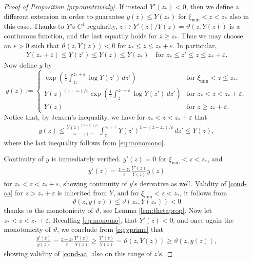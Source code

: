 \documentclass[reqno]{amsart}
\newcommand{\eps}{{\varepsilon}}
\begin{document}
\begin{proof}[Proof of Proposition \ref{prp:nontrivialy}]
    If instead $Y'(z_*)<0$, then we define a different extension in order to guarantee $y(z)\le Y(z_*)$ for $\xi_\text{min}<z<z_*$ also in this case. Thanks to $Y$'s $C^1$-regularity, $z\mapsto Y'(z)/Y(z) = \vartheta(z,Y(z))$ is a continuous function, 
    and the last equatily holds for $z\ge z_*$. 
    Thus we may choose an $\eps>0$ such that $\vartheta(z,Y(z))<0$ for $z_*\le z\le z_*+\eps$. In particular, 
    \begin{align}
        \label{eq:monomono}
        Y(z_*+\eps)\le Y(z') \le Y(z) \le Y(z_*) \quad \text{for $z_*\le z'\le z\le z_*+\eps$}.
    \end{align}  
    Now define $y$ by 
    \[
    y(z):=\begin{cases}
            \exp\left(\frac1\eps\int_{z_*}^{z_*+\eps}\log Y(z')\,dz'\right) & \text{for $\xi_\text{min}<z\le z_*$}, \\
            Y(z)^{(z-z_*)/\eps}\exp\left(\frac1\eps\int_z^{z_*+\eps}\log Y(z')\,dz'\right) & \text{for $z_*<z<z_*+\eps$},\\
            Y(z) & \text{for $z\ge z_*+\eps$}.
        \end{cases}
    \]
    Notice that, by Jensen's inequality, we have for $z_*<z<z_*+\eps$ that
    \begin{align}
        \label{eq:monomo}
        y(z) \le \frac{Y(z)^{(z-z_*)/\eps}}{z_*-z+\eps}\int_z^{z_*+\eps}Y(z')^{1-(z-z_*)/\eps}\,dz' \le Y(z),
    \end{align}
    where the last inequality follows from \eqref{eq:monomono}.
    
    Continuity of $y$ is immediately verified. $y'(z)=0$ for $\xi_\text{min}<z<z_*$, and
    \begin{align}
        \label{eq:yprime}
        y'(z) = \frac{z-z_*}{\eps}\frac{Y'(z)}{Y(z)}y(z)
    \end{align}
    for $z_*<z<z_*+\eps$, showing continuity of $y$'s derivative as well. Validity of \eqref{cond-aa} for $z>z_*+\eps$ is inherited from $Y$, and for $\xi_\text{min}<z<z_*$, it follows from 
    \[ \vartheta(z,y(z)) \le \vartheta(z_*,Y(z_*)) < 0  \]
    thanks to the monotonicity of $\vartheta$, see Lemma \ref{lem:thetaprop}. Now let $z_*<z<z_*+\eps$. Recalling \eqref{eq:monomo}, that $Y'(z)<0$, and once again the monotonicity of $\vartheta$, we conclude from \eqref{eq:yprime} that
    \begin{align*}
        \frac{y'(z)}{y(z)} 
        = \frac{z-z_*}{\eps}\frac{Y'(z)}{Y(z)}
        \ge \frac{Y'(z)}{Y(z)}
        = \vartheta(z,Y(z))
        \ge \vartheta(z,y(z)),
    \end{align*}
    showing validity of \eqref{cond-aa} also on this range of $z$'s.
\end{proof}
\end{document}
